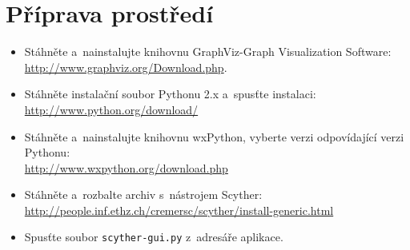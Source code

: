 \documentclass[a4paper,final]{article}
\begin{document}
\section*{Příprava prostředí}
\begin{itemize}
  \item Stáhněte a~nainstalujte knihovnu GraphViz-Graph Visualization Software:\\
  \url{http://www.graphviz.org/Download.php}.
  \item Stáhněte instalační soubor Pythonu 2.x a~spusťte instalaci:\\
  \url{http://www.python.org/download/}
  \item Stáhněte a~nainstalujte knihovnu wxPython, vyberte verzi odpovídající verzi Pythonu:\\
  \url{http://www.wxpython.org/download.php}
  \item Stáhněte a~rozbalte archiv s~nástrojem Scyther:\\
  \url{http://people.inf.ethz.ch/cremersc/scyther/install-generic.html}
  \item Spusťte soubor \texttt{scyther-gui.py} z~adresáře aplikace.
\end{itemize}

\lstset{numbers=left, stepnumber=1, numberstyle=\tiny,
        tabsize=1, xleftmargin=0.6cm, basicstyle=\ttfamily,
        morecomment=[l]\#}


\end{document}
